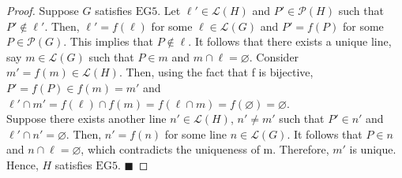 \documentclass[a4paper, 10pt]{exam}
\begin{document}
\begin{questions}
\begin{enumerate}
\begin{proof}
       Suppose $G$ satisfies $\text{EG5}$. Let $\ell' \in \mathscr{L}(H)$ and $P' \in \mathscr{P}(H)$ such that $P' \not\in \ell'$. Then, $\ell' = f(\ell)$ for some $\ell \in \mathscr{L}(G)$ and $P' = f(P)$ for some $P \in \mathscr{P}(G)$. This implies that $P \not\in \ell$. It follows that there exists a unique line, say $m \in \mathscr{L}(G)$ such that $P \in m$ and $m \cap \ell = \varnothing.$ Consider $m' = f(m) \in \mathscr{L}(H)$. Then, using the fact that f is bijective, $P' = f(P) \in f(m) = m'$ and $\ell' \cap m' = f(\ell) \cap f(m) = f(\ell \cap m) = f(\varnothing) = \varnothing$. \\

       Suppose there exists another line $n' \in \mathscr{L}(H)$,  $n' \neq m'$ such that $P' \in n'$ and $\ell' \cap n' = \varnothing$. Then, $n' = f(n)$ for some line $n \in \mathscr{L}(G)$. It follows that $P \in n$ and $n \cap \ell = \varnothing$, which contradicts the uniqueness of m. Therefore, $m'$ is unique. \\

       Hence, $H$ satisfies $\text{EG5}$. $\blacksquare$
        \end{proof}
    \end{enumerate}
    
    
\end{questions}
\end{document}
